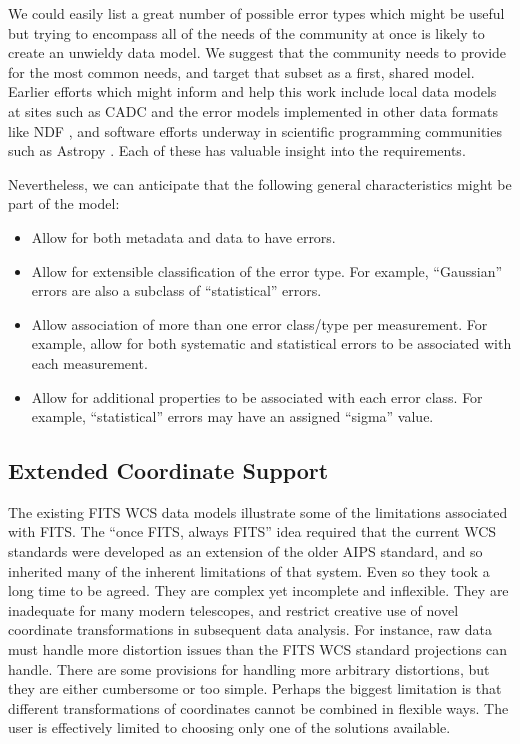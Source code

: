 \documentclass[final,authoryear,5p,times,twocolumn]{elsarticle}
\begin{document}
{{We could easily list a great number of possible error types which
might be useful but trying to encompass all of the needs of the
community at once is likely to create an unwieldy data model. We
suggest that the community needs to provide for the most common needs,
and target that subset as a first, shared model. Earlier efforts which
might inform and help this work include local data models at sites
such as CADC \citep{2012ASPC..461..339D} and the error
models implemented in other data formats like NDF
\citep[although see for example][]{1991STARB...8...19M}, and software
efforts underway in scientific programming communities such as Astropy
\citep{2013A&A...558A..33A}. Each of these has valuable insight into
the requirements.


Nevertheless, we can anticipate that the following general
characteristics might be part of the model:

\begin{itemize}
\item Allow for both metadata and data to have errors.

\item Allow for extensible classification of the error type. For example,
``Gaussian'' errors are also a subclass of ``statistical'' errors.

\item Allow association of more than one error class/type per
measurement. For example, allow for both systematic and statistical
errors to be associated with each measurement.

\item Allow for additional properties to be associated with each error
class. For example, ``statistical'' errors may have an assigned ``sigma''
value.
\end{itemize}


\subsection{Extended Coordinate Support}
\label{sec:wcs}


The existing FITS WCS data models illustrate some of the limitations
associated with FITS. The ``once FITS, always FITS'' idea required that
the current WCS standards were developed as an extension of the older
AIPS standard, and so inherited many of the inherent limitations of
that system. Even so they took a long time to be agreed. They are
complex yet incomplete and inflexible. They are inadequate for many
modern telescopes, and restrict creative use of novel coordinate
transformations in subsequent data analysis. For instance, raw data
must handle more distortion issues than the FITS WCS standard
projections can handle. There are some provisions for handling more
arbitrary distortions, but they are either cumbersome or too
simple. Perhaps the biggest limitation is that different
transformations of coordinates cannot be combined in flexible
ways. The user is effectively limited to choosing only one of the solutions
available.


}}
\end{document}
